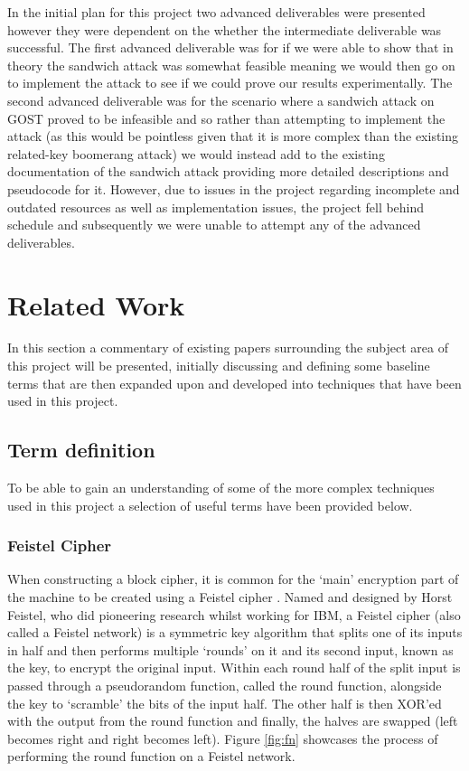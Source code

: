 \documentclass[10pt,journal,compsoc]{IEEEtran}
\begin{document}
In the initial plan for this project two advanced deliverables were presented however they were dependent on the whether the intermediate deliverable was successful. The first advanced deliverable was for if we were able to show that in theory the sandwich attack was somewhat feasible meaning we would then go on to implement the attack to see if we could prove our results experimentally. The second advanced deliverable was for the scenario where a sandwich attack on GOST proved to be infeasible and so rather than attempting to implement the attack (as this would be pointless given that it is more complex than the existing related-key boomerang attack) we would instead add to the existing documentation of the sandwich attack providing more detailed descriptions and pseudocode for it. However, due to issues in the project regarding incomplete and outdated resources as well as implementation issues, the project fell behind schedule and subsequently we were unable to attempt any of the advanced deliverables.

\section{Related Work}
In this section a commentary of existing papers surrounding the subject area of this project will be presented, initially discussing and defining some baseline terms that are then expanded upon and developed into techniques that have been used in this project.
\subsection{Term definition}
To be able to gain an understanding of some of the more complex techniques used in this project a selection of useful terms have been provided below.
\subsubsection{Feistel Cipher}
When constructing a block cipher, it is common for the ‘main’ encryption part of the machine to be created using a Feistel cipher \cite{nachef2017feistel}. Named and designed by Horst Feistel, who did pioneering research whilst working for IBM, a Feistel cipher (also called a Feistel network) is a symmetric key algorithm that splits one of its inputs in half and then performs multiple ‘rounds’ on it and its second input, known as the key, to encrypt the original input. Within each round half of the split input is passed through a pseudorandom function, called the round function, alongside the key to ‘scramble’ the bits of the input half. The other half is then XOR’ed with the output from the round function and finally, the halves are swapped (left becomes right and right becomes left). Figure \ref{fig:fn} showcases the process of performing the round function on a Feistel network.
\end{document}
